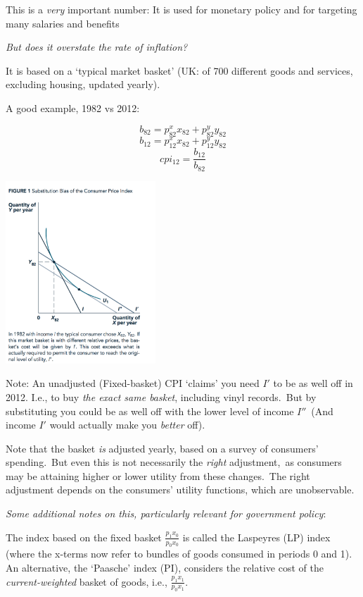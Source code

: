 \documentclass[]{article}
\begin{document}
This is a \emph{very} important number: It is used for monetary policy and for targeting many salaries and benefits

\emph{But does it overstate the rate of inflation?}

It is based on a `typical market basket' (UK: of 700 different goods and services, excluding housing, updated yearly).

A good example, 1982 vs 2012:

\[b_{82}=p^x_{82}x_{82}+p^y_{82}y_{82}\]
\[b_{12}=p^x_{12}x_{82}+p^y_{12}y_{82}\]
\[cpi_{12}=\frac{b_{12}}{b_{82}}\]

\includegraphics[height=2.7in]{picsfigs/cpi_bias.png}

Note: An unadjusted (Fixed-basket) CPI `claims' you need \(I'\) to be as well off in 2012. I.e., to buy \emph{the exact same basket}, including vinyl records.~But by substituting you could be as well off with the lower level of income \(I''\)~(And income \(I'\) would actually make you \emph{better} off).

\bigskip

Note that the basket \emph{is} adjusted yearly, based on a survey of consumers' spending.~But even this is not necessarily the \emph{right} adjustment,~as consumers may be attaining higher or lower utility from these changes.~The right adjustment depends on the consumers' utility functions, which are unobservable.

\bigskip

\emph{Some additional notes on this, particularly relevant for government policy}:

The index based on the fixed basket \(\frac{p_1 x_0}{p_0 x_0}\) is called the Laspeyres (LP) index (where the x-terms now refer to bundles of goods consumed in periods 0 and 1). An alternative, the `Paasche' index (PI), considers the relative cost of the \emph{current-weighted} basket of goods, i.e., \(\frac{p_1 x_1}{p_0 x_1}\).
\end{document}
